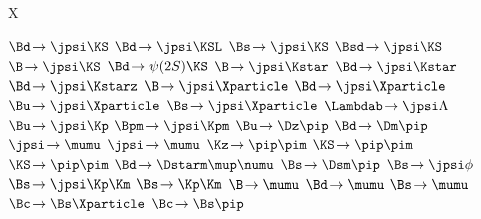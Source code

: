 
\newmathsymbol{\BF}           {\xspace}
\newmathsymbol{\BR}           {\BF}

\renewcommand{\to}            {\ensuremath{\rightarrow}\xspace}
\newcommand{\decay}[2]        {\ensuremath{#1\!\to #2}\xspace}
\newcommand{\decaybf}[2]      {\ensuremath{#1\!\pmb{\to} #2}\xspace} %

\newmathsymbol{\Xparticle}      {X\xspace}

\newmathsymbol{\BdToJpsiKS}      {\decay{\Bd}{\jpsi\KS}}
\newmathsymbol{\BdToJpsiKSL}     {\decay{\Bd}{\jpsi\KSL}}
\newmathsymbol{\BsToJpsiKS}      {\decay{\Bs}{\jpsi\KS}}
\newmathsymbol{\BsdToJpsiKS}     {\decay{\Bsd}{\jpsi\KS}}
\newmathsymbol{\BToJpsiKS}       {\decay{\B}{\jpsi\KS}}
\newmathsymbol{\BdToPsiTwoSKS}   {\decay{\Bd}{\psi(2S)\KS}}
\newmathsymbol{\BToJpsiKstar}    {\decay{\B}{\jpsi\Kstar}}
\newmathsymbol{\BdToJpsiKstar}   {\decay{\Bd}{\jpsi\Kstar}}
\newmathsymbol{\BdToJpsiKstarz}  {\decay{\Bd}{\jpsi\Kstarz}}
\newmathsymbol{\BToJpsiX}        {\decay{\B}{\jpsi\Xparticle}}
\newmathsymbol{\BdToJpsiX}       {\decay{\Bd}{\jpsi\Xparticle}}
\newmathsymbol{\BuToJpsiX}       {\decay{\Bu}{\jpsi\Xparticle}}
\newmathsymbol{\BsToJpsiX}       {\decay{\Bs}{\jpsi\Xparticle}}
\newmathsymbol{\LbToJpsiLambda}  {\decay{\Lambdab}{\jpsi\Lambda}}
\newmathsymbol{\BuToJpsiK}       {\decay{\Bu}{\jpsi\Kp}}
\newmathsymbol{\BuToJpsiKcc}     {\decay{\Bpm}{\jpsi\Kpm}}
\newmathsymbol{\BuToDpi}         {\decay{\Bu}{\Dz\pip}}
\newmathsymbol{\BdToDpi}         {\decay{\Bd}{\Dm\pip}}
\newmathsymbol{\JpsiToMuMu}      {\decay{\jpsi}{\mumu}}
\newmathsymbol{\JpsiTomumu}      {\decay{\jpsi}{\mumu}}
\newmathsymbol{\KzToPiPi}        {\decay{\Kz}{\pip\pim}}
\newmathsymbol{\KSToPiPi}        {\decay{\KS}{\pip\pim}}
\newmathsymbol{\KSTopipi}        {\decay{\KS}{\pip\pim}}
\newmathsymbol{\BdToDstarmunu}   {\decay{\Bd}{\Dstarm\mup\numu}}
\newmathsymbol{\BsToDspi}        {\decay{\Bs}{\Dsm\pip}}
\newmathsymbol{\BsToJpsiphi}     {\decay{\Bs}{\jpsi\phi}}
\newmathsymbol{\BsToJpsiKK}      {\decay{\Bs}{\jpsi\Kp\Km}}
\newmathsymbol{\BsToKK}          {\decay{\Bs}{\Kp\Km}}
\newmathsymbol{\BToMuMu}         {\decay{\B}{\mumu}}
\newmathsymbol{\BdToMuMu}        {\decay{\Bd}{\mumu}}
\newmathsymbol{\BsToMuMu}        {\decay{\Bs}{\mumu}}
\newmathsymbol{\inclJPsi}        {\ \jpsi}
\newmathsymbol{\BcToBsX}         {\decay{\Bc}{\Bs\Xparticle}}
\newmathsymbol{\BcToBspi}        {\decay{\Bc}{\Bs\pip}}


